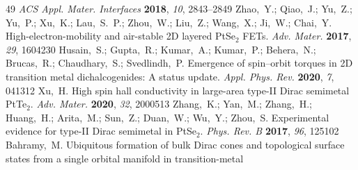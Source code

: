 \documentclass[journal=jacsat,manuscript=article]{achemso}
\begin{document}
\begin{mcitethebibliography}{49}
  \emph{ACS Appl. Mater. Interfaces} \textbf{2018}, \emph{10}, 2843--2849\relax
\mciteBstWouldAddEndPuncttrue
\mciteSetBstMidEndSepPunct{\mcitedefaultmidpunct}
{\mcitedefaultendpunct}{\mcitedefaultseppunct}\relax
\EndOfBibitem
{}
Zhao,~Y.; Qiao,~J.; Yu,~Z.; Yu,~P.; Xu,~K.; Lau,~S.~P.; Zhou,~W.; Liu,~Z.;
  Wang,~X.; Ji,~W.; Chai,~Y. High-electron-mobility and air-stable 2D layered
  PtSe$_2$ FETs. \emph{Adv. Mater.} \textbf{2017}, \emph{29}, 1604230\relax
\mciteBstWouldAddEndPuncttrue
\mciteSetBstMidEndSepPunct{\mcitedefaultmidpunct}
{\mcitedefaultendpunct}{\mcitedefaultseppunct}\relax
\EndOfBibitem
{}
Husain,~S.; Gupta,~R.; Kumar,~A.; Kumar,~P.; Behera,~N.; Brucas,~R.;
  Chaudhary,~S.; Svedlindh,~P. Emergence of spin--orbit torques in 2D
  transition metal dichalcogenides: A status update. \emph{Appl. Phys. Rev.}
  \textbf{2020}, \emph{7}, 041312\relax
\mciteBstWouldAddEndPuncttrue
\mciteSetBstMidEndSepPunct{\mcitedefaultmidpunct}
{\mcitedefaultendpunct}{\mcitedefaultseppunct}\relax
\EndOfBibitem
{}
Xu,~H.   High spin hall conductivity in large-area type-II Dirac
  semimetal PtTe$_2$. \emph{Adv. Mater.} \textbf{2020}, \emph{32},
  2000513\relax
\mciteBstWouldAddEndPuncttrue
\mciteSetBstMidEndSepPunct{\mcitedefaultmidpunct}
{\mcitedefaultendpunct}{\mcitedefaultseppunct}\relax
\EndOfBibitem
{}
Zhang,~K.; Yan,~M.; Zhang,~H.; Huang,~H.; Arita,~M.; Sun,~Z.; Duan,~W.; Wu,~Y.;
  Zhou,~S. Experimental evidence for type-II Dirac semimetal in PtSe$_2$.
  \emph{Phys. Rev. B} \textbf{2017}, \emph{96}, 125102\relax
\mciteBstWouldAddEndPuncttrue
\mciteSetBstMidEndSepPunct{\mcitedefaultmidpunct}
{\mcitedefaultendpunct}{\mcitedefaultseppunct}\relax
\EndOfBibitem
{}
Bahramy,~M.   Ubiquitous formation of bulk Dirac cones and
  topological surface states from a single orbital manifold in transition-metal

\end{mcitethebibliography}
\end{document}

